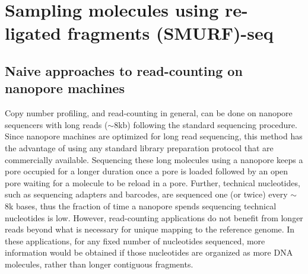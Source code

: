 \chapter{Sampling molecules using re-ligated fragments (SMURF)-seq}
\label{ch3}


\section{Naive approaches to read-counting on nanopore machines}
Copy number profiling, and read-counting in general, can be done on
nanopore sequencers with long reads ($\sim$8kb) following the standard
sequencing procedure.
Since nanopore machines are optimized for long read sequencing, this
method has the advantage of using any standard library preparation
protocol that are commercially available.  Sequencing these long
molecules using a nanopore keeps a pore occupied for a longer duration
once a pore is loaded followed by an open pore waiting for a molecule to
be reload in a pore.  Further, technical nucleotides, such as sequencing
adapters and barcodes, are sequenced one (or twice) every $\sim$8k
bases, thus the fraction of time a nanopore spends sequencing technical
nucleotides is low.
However, read-counting applications do not benefit from longer reads
beyond what is necessary for unique mapping to the reference genome. In
these applications, for any fixed number of nucleotides sequenced, more
information would be obtained if those nucleotides are organized as more
DNA molecules, rather than longer contiguous fragments.

